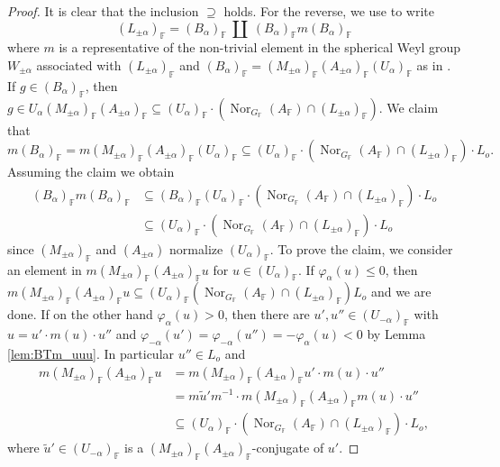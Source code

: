 \documentclass[12pt]{amsart}
\newcommand{\F}{\mathbb{F} }
\numberwithin{equation}{section}
\theoremstyle{remark} %
\begin{document}
		\begin{proof}
			It is clear that the inclusion $\supseteq$ holds. For the reverse, we use \cite[Corollary \ref{I-cor:levi_Bruhat}]{AppAGRCF} to write
			$$
			(L_{\pm \alpha})_\F = (B_\alpha)_\F  \ \amalg \ (B_\alpha)_\F m (B_\alpha)_\F
			$$
			where $m$ is a representative of the non-trivial element in the spherical Weyl group $W_{\pm\alpha}$ associated with $(L_{\pm \alpha})_\F$ and $(B_\alpha)_\F = (M_{\pm \alpha})_\F (A_{\pm \alpha})_\F (U_\alpha)_\F$ as in \cite[Section \ref{I-sec:rank1}]{AppAGRCF}. If $g \in (B_\alpha)_\F$, then $g \in U_\alpha (M_{\pm \alpha})_\F (A_{\pm \alpha})_\F \subseteq (U_\alpha)_\F \cdot (\operatorname{Nor}_{G_\F}(A_\F)\cap (L_{\pm\alpha})_\F) $. We claim that
			$$
			m(B_\alpha)_\F = m (M_{\pm\alpha})_\F (A_{\pm \alpha})_\F (U_{\alpha})_\F \subseteq (U_{\alpha})_\F \cdot (\operatorname{Nor}_{G_\F}(A_\F) \cap (L_{\pm \alpha})_\F)\cdot L_o.
			$$
			Assuming the claim we obtain
			\begin{align*}
				(B_\alpha)_\F m (B_\alpha)_\F &\subseteq (B_\alpha)_\F (U_\alpha)_\F \cdot (\operatorname{Nor}_{G_\F}(A_\F) \cap (L_{\pm \alpha})_\F)\cdot L_o \\
				&\subseteq (U_\alpha)_\F \cdot (\operatorname{Nor}_{G_\F}(A_\F) \cap (L_{\pm \alpha})_\F)\cdot L_o
			\end{align*}
			since $(M_{\pm\alpha})_\F$ and $(A_{\pm\alpha})$ normalize $(U_\alpha)_\F$. To prove the claim, we consider an element in $m(M_{\pm \alpha})_\F (A_{\pm \alpha})_\F u$ for $u \in (U_\alpha)_\F$. If $\varphi_\alpha(u)\leq 0$, then $m(M_{\pm \alpha})_\F (A_{\pm \alpha})_\F u \subseteq (U_\alpha)_\F (\operatorname{Nor}_{G_\F}(A_\F) \cap (L_{\pm \alpha})_\F) L_o$ and we are done. If on the other hand $\varphi_\alpha(u) > 0$, then there are $u',u'' \in (U_{-\alpha})_\F$ with $u = u' \cdot m(u) \cdot u''$ and  $\varphi_{-\alpha}(u') = \varphi_{-\alpha}(u'') = -\varphi_\alpha(u) <0$ by Lemma \ref{lem:BTm_uuu}. In particular $u'' \in L_o$ and
			\begin{align*}
				m(M_{\pm \alpha})_\F (A_{\pm \alpha})_\F u &= m(M_{\pm \alpha})_\F (A_{\pm \alpha})_\F u' \cdot m(u) \cdot u'' \\
				&= m\tilde{u}'m^{-1} \cdot m(M_{\pm \alpha})_\F (A_{\pm \alpha})_\F m(u) \cdot u'' \\
				&\subseteq (U_\alpha)_\F \cdot (\operatorname{Nor}_{G_\F}(A_\F) \cap (L_{\pm \alpha})_\F ) \cdot L_o,
			\end{align*}
			where $\tilde{u}' \in (U_{-\alpha})_\F$ is a $(M_{\pm \alpha})_\F (A_{\pm \alpha})_\F$-conjugate of $u'$.
		\end{proof}
\end{document}
